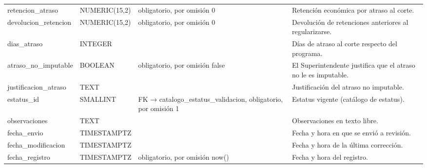 \begin{xltabular}{\linewidth}{@{}>{\ttfamily\footnotesize}p{4.9cm}>{\ttfamily\footnotesize}p{2.4cm}>{\raggedright\arraybackslash\footnotesize}p{3.3cm}>{\footnotesize}X@{}}
retencion\_atraso & NUMERIC(15,2) & obligatorio, por omisión 0 & Retención económica por atraso al corte.\\
devolucion\_retencion & NUMERIC(15,2) & obligatorio, por omisión 0 & Devolución de retenciones anteriores al regularizarse.\\
dias\_atraso & INTEGER &  & Días de atraso al corte respecto del programa.\\
atraso\_no\_imputable & BOOLEAN & obligatorio, por omisión false & El Superintendente justifica que el atraso no le es imputable.\\
justificacion\_atraso & TEXT &  & Justificación del atraso no imputable.\\
estatus\_id & SMALLINT & FK → catalogo\_estatus\_validacion, obligatorio, por omisión 1 & Estatus vigente (catálogo de estatus).\\
observaciones & TEXT &  & Observaciones en texto libre.\\
fecha\_envio & TIMESTAMPTZ &  & Fecha y hora en que se envió a revisión.\\
fecha\_modificacion & TIMESTAMPTZ &  & Fecha y hora de la última corrección.\\
fecha\_registro & TIMESTAMPTZ & obligatorio, por omisión now() & Fecha y hora del registro.\\
\end{xltabular}

